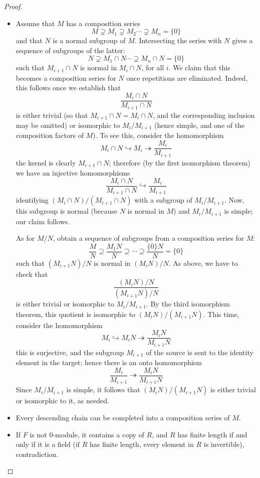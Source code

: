 \begin{proof}
\mbox{}
\begin{itemize}
\item Assume that $M$ has a composition series
\[M\supsetneq M_1\supsetneq M_2\cdots\supsetneq M_n=\{0\}\]
and that $N$ is a normal subgroup of $M$. Intersecting the series with $N$ gives a sequence of subgroups of the latter:
\[N\supsetneq M_1\cap N\cdots\supsetneq M_n\cap N=\{0\}\]
such that $M_{i+1}\cap N$ is normal in $M_i\cap N$, for all $i$. We claim that this becomes a
composition series for $N$ once repetitions are eliminated. Indeed, this follows once we establish that
\[\dfrac{M_i\cap N}{M_{i+1}\cap N}\]
is either trivial (so that $M_{i+1}\cap N=M_i\cap N$, and the corresponding inclusion may be omitted) or isomorphic to $M_i/M_{i+1}$ (hence simple, and one of the composition factors of $M$). To see this, consider the homomorphism
\[M_i\cap N\hookrightarrow M_i\twoheadrightarrow\dfrac{M_i}{M_{i+1}}\]
the kernel is clearly $M_{i+1}∩N$; therefore (by the first isomorphism theorem) we have an injective homomorphisms
\[\dfrac{M_i\cap N}{M_{i+1}\cap N}\hookrightarrow\dfrac{M_i}{M_{i+1}}\]
identifying $(M_i\cap N)/(M_{i+1}\cap N)$ with a subgroup of $M_i/M_{i+1}$. Now, this subgroup is normal (because $N$ is normal in $M$) and $M_i/M_{i+1}$ is simple; our claim follows.\par
As for $M/N$, obtain a sequence of subgroups from a composition series for $M$:
\[\dfrac{M}{N}\supseteq\dfrac{M_1N}{N}\supseteq\cdots\supseteq\dfrac{\{0\}N}{N}=\{0\}\]
such that $(M_{i+1}N)/N$ is normal in $(M_iN)/N$. As above, we have to check that
\[\dfrac{(M_iN)/N}{(M_{i+1}N)/N}\]
is either trivial or isomorphic to $M_i/M_{i+1}$. By the third isomorphism theorem, this
quotient is isomorphic to $(M_iN)/(M_{i+1}N)$. This time, consider the homomorphism
\[M_i\hookrightarrow M_iN\twoheadrightarrow \dfrac{M_iN}{M_{i+1}N}\]
this is surjective, and the subgroup $M_{i+1}$ of the source is sent to the identity element in the target; hence there is an onto homomorphism
\[\dfrac{M_i}{M_{i+1}}\twoheadrightarrow\dfrac{M_iN}{M_{i+1}N}\]
Since $M_i/M_{i+1}$ is simple, it follows that $(M_iN)/(M_{i+1}N)$ is either trivial or
isomorphic to it, as needed.
\item Every descending chain can be completed into a composition series of $M$.
\item If $F$ is not $0$-module, it contains a copy of $R$, and $R$ has finite length if and only if it is a field (if $R$ has finite length, every element in $R$ is invertible), contradiction.
\end{itemize}
\end{proof}
